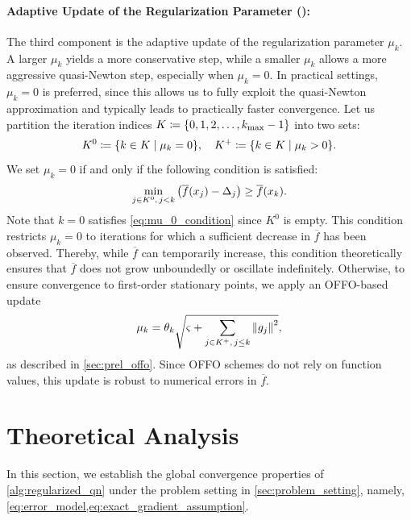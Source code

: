 \documentclass[journal]{subfiles}
\begin{document}
\paragraph{Adaptive Update of the Regularization Parameter (): }\label{sec:algorithm_components_mu}

The third component is the adaptive update of the regularization parameter $\mu_k$.
A larger $\mu_k$ yields a more conservative step, while a smaller $\mu_k$ allows a more aggressive quasi-Newton step, especially when $\mu_k=0$.
In practical settings, $\mu_k=0$ is preferred, since this allows us to fully exploit the quasi-Newton approximation and typically leads to practically faster convergence.
Let us partition the iteration indices $K\coloneqq \{0,1,2,\ldots, k_{\max}-1\}$ into two sets:
\begin{equation}\label{eq:def_K0_Kplus}
    K^0 \coloneqq \{k \in K \mid \mu_k = 0\}, \quad K^+ \coloneqq \{k \in K \mid \mu_k > 0\}.
\end{equation}
We set $\mu_k=0$ if and only if the following condition is satisfied:
\begin{equation}\label{eq:mu_0_condition}
    \min_{j \in K^0, \, j < k} \qty(\overline{f}(x_j)- \Delta_j) \ge \overline{f}(x_k).
\end{equation}
Note that $k=0$ satisfies \cref{eq:mu_0_condition} since $K^0$ is empty.
This condition restricts $\mu_k=0$ to iterations for which a sufficient decrease in $\overline f$ has been observed.
Thereby, while $\overline{f}$ can temporarily increase, this condition theoretically ensures that $\overline{f}$ does not grow unboundedly or oscillate indefinitely.
Otherwise, to ensure convergence to first-order stationary points, we apply an OFFO-based update
\begin{equation}\label{eq:offo_based_update}
    \mu_k = \theta_k \sqrt{\varsigma+\sum_{j \in K^+, \, j \leq k}\norm{g_j}^2},
\end{equation}
as described in \cref{sec:prel_offo}.
Since OFFO schemes do not rely on function values, this update is robust to numerical errors in $\overline{f}$.


\section{Theoretical Analysis}\label{sec:analysis}

In this section, we establish the global convergence properties of
\cref{alg:regularized_qn} under the problem setting in
\cref{sec:problem_setting}, namely,
\cref{eq:error_model,eq:exact_gradient_assumption}.
\end{document}
